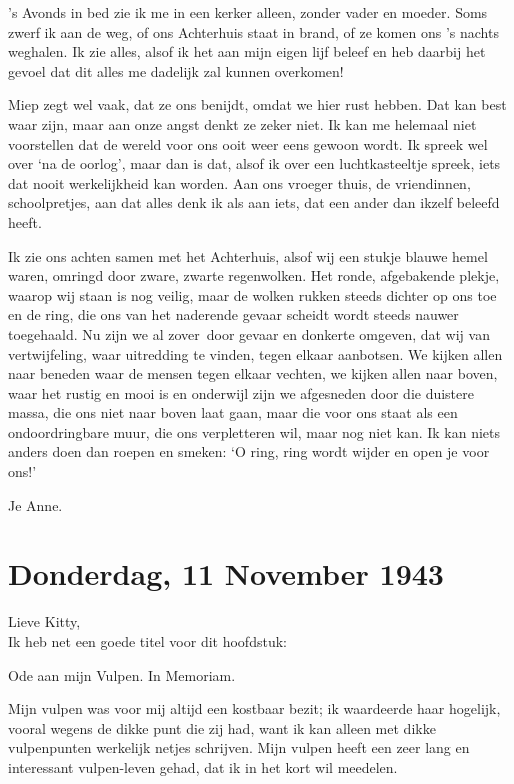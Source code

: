 \documentclass{book}
\begin{document}
's Avonds in bed zie ik me in een kerker alleen, zonder vader en moeder.
Soms zwerf ik aan de weg, of ons Achterhuis staat in brand, of ze komen
ons 's nachts weghalen. Ik zie alles, alsof ik het aan mijn eigen lijf
beleef en heb daarbij het gevoel dat dit alles me dadelijk zal kunnen
overkomen!

Miep zegt wel vaak, dat ze ons benijdt, omdat we hier rust hebben. Dat
kan best waar zijn, maar aan onze angst denkt ze zeker niet. Ik kan me
helemaal niet voorstellen dat de wereld voor ons ooit weer eens gewoon
wordt. Ik spreek wel over `na de oorlog', maar dan is dat, alsof ik over
een luchtkasteeltje spreek, iets dat nooit werkelijkheid kan worden. Aan
ons vroeger thuis, de vriendinnen, schoolpretjes, aan dat alles denk ik
als aan iets, dat een ander dan ikzelf beleefd heeft.

Ik zie ons achten samen met het Achterhuis, alsof wij een stukje blauwe
hemel waren, omringd door zware, zwarte regenwolken. Het ronde,
afgebakende plekje, waarop wij staan is nog veilig, maar de wolken
rukken steeds dichter op ons toe en de ring, die ons van het naderende
gevaar scheidt wordt steeds nauwer toegehaald. Nu zijn we al zover~door
gevaar en donkerte omgeven, dat wij van vertwijfeling, waar uitredding
te vinden, tegen elkaar aanbotsen. We kijken allen naar beneden waar de
mensen tegen elkaar vechten, we kijken allen naar boven, waar het rustig
en mooi is en onderwijl zijn we afgesneden door die duistere massa, die
ons niet naar boven laat gaan, maar die voor ons staat als een
ondoordringbare muur, die ons verpletteren wil, maar nog niet kan. Ik
kan niets anders doen dan roepen en smeken: `O ring, ring wordt wijder
en open je voor ons!'

Je Anne.

\chapter{Donderdag, 11 November 1943}

Lieve Kitty,\\Ik heb net een goede titel voor dit hoofdstuk:

Ode aan mijn Vulpen. In Memoriam.

Mijn vulpen was voor mij altijd een kostbaar bezit; ik waardeerde haar
hogelijk, vooral wegens de dikke punt die zij had, want ik kan alleen
met dikke vulpenpunten werkelijk netjes schrijven. Mijn vulpen heeft een
zeer lang en interessant vulpen-leven gehad, dat ik in het kort wil
meedelen.
\end{document}

